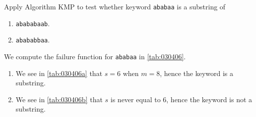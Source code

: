 \begin{exercise}\label{ex:030406}
    Apply Algorithm KMP to test whether keyword \texttt{ababaa} is a substring
    of
    \begin{enumerate}[label=\alph*)]
        \item \texttt{abababaab}.
        \item \texttt{abababbaa}.
    \end{enumerate}
\end{exercise}
\begin{solution}\label{sol:030406}
    We compute the failure function for \texttt{ababaa} in \autoref{tab:030406}.
    
    \begin{enumerate}[label=\alph*)]
        \item We see in \autoref{tab:030406a} that $s = 6$ when $m = 8$, hence the keyword is a
        substring.
        
        \item We see in \autoref{tab:030406b} that $s$ is never equal to 6, hence the keyword is not a
        substring.
        
    \end{enumerate}
\end{solution}
